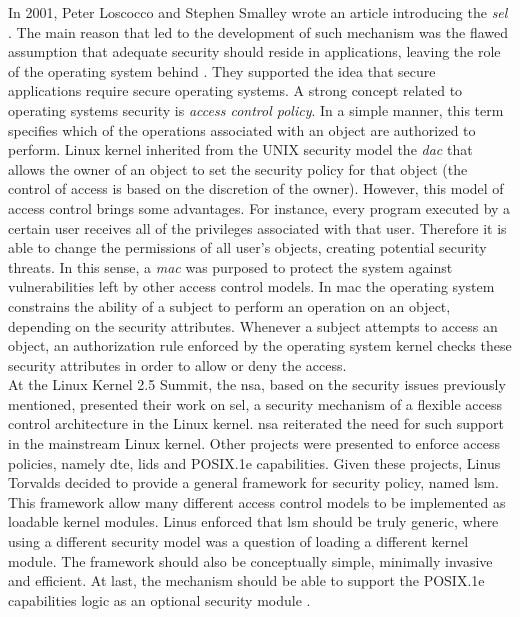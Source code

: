 In 2001, Peter Loscocco and Stephen Smalley wrote an article introducing the \textit{\gls{sel}} \cite{LS01}. The main reason that led to the development of such mechanism was the flawed assumption that adequate security should reside in applications, leaving the role of the operating system behind \cite{LSMTTF98}. They supported the idea that secure applications require secure operating systems. A strong concept related to operating systems security is \textit{access control policy}. In a simple manner, this term specifies which of the operations associated with an object are authorized to perform. Linux kernel inherited from the UNIX security model the \textit{\gls{dac}} that allows the owner of an object to set the security policy for that object (the control of access is based on the discretion of the owner). However, this model of access control brings some advantages. For instance, every program executed by a certain user receives all of the privileges associated with that user. Therefore it is able to change the permissions of all user's objects, creating potential security threats. In this sense, a \textit{\gls{mac}} was purposed to protect the system against vulnerabilities left by other access control models. In \gls{mac} the operating system constrains the ability of a subject to perform an operation on an object, depending on the security attributes. Whenever a subject attempts to access an object, an authorization rule enforced by the operating system kernel checks these security attributes in order to allow or deny the access.\\

\noindent
At the Linux Kernel 2.5 Summit, the \gls{nsa}, based on the security issues previously mentioned, presented their work on \gls{sel}, a security mechanism of a flexible access control architecture in the Linux kernel. \gls{nsa} reiterated the need for such support in the mainstream Linux kernel. Other projects were presented to enforce access policies, namely \gls{dte}, \gls{lids} and POSIX.1e capabilities. Given these projects, Linus Torvalds decided to provide a general framework for security policy, named \gls{lsm}. This framework allow many different access control models to be implemented as loadable kernel modules. Linus enforced that \gls{lsm} should be truly generic, where using a different security model was a question of loading a different kernel module. The framework should also be conceptually simple, minimally invasive and efficient. At last, the mechanism should be able to support the POSIX.1e capabilities logic as an optional security module \cite{WCSMK02}.\\

